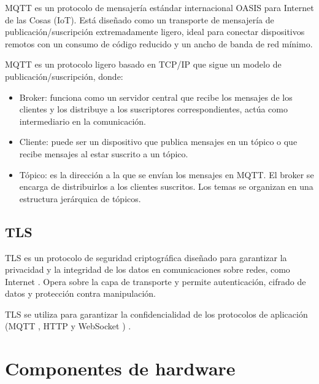 MQTT es un protocolo de mensajería estándar internacional OASIS
\cite{OASIS_MQTT_Standard} para Internet de las Cosas (IoT). Está diseñado como
un transporte de mensajería de publicación/suscripción extremadamente ligero,
ideal para conectar dispositivos remotos con un consumo de código reducido y un
ancho de banda de red mínimo.

MQTT es un protocolo ligero basado en TCP/IP \cite{AWS_MQTT} que sigue un
modelo de publicación/suscripción, donde:

\begin{itemize}
	\item Broker: funciona como un servidor central que recibe los mensajes de los
	      clientes y los distribuye a los suscriptores correspondientes, actúa como
	      intermediario en la comunicación.
	\item Cliente: puede ser un dispositivo que publica mensajes en un tópico o que
	      recibe mensajes al estar suscrito a un tópico.
	\item Tópico: es la dirección a la que se envían los mensajes en MQTT. El broker se
	      encarga de distribuirlos a los clientes suscritos. Los temas se organizan en
	      una estructura jerárquica de tópicos.
\end{itemize}

\subsection{TLS}

TLS es un protocolo de seguridad criptográfica diseñado para garantizar la
privacidad y la integridad de los datos en comunicaciones sobre redes, como
Internet \cite{tls}. Opera sobre la capa de transporte y permite autenticación,
cifrado de datos y protección contra manipulación.

TLS se utiliza para garantizar la confidencialidad de los protocolos de
aplicación (MQTT \cite{OASIS_MQTT_Standard}, HTTP \cite{IBMTCPIP} y WebSocket
\cite{RFC6455}) \cite{awsiot_tls}.


\section{Componentes de hardware}\label{sec:hardware}

